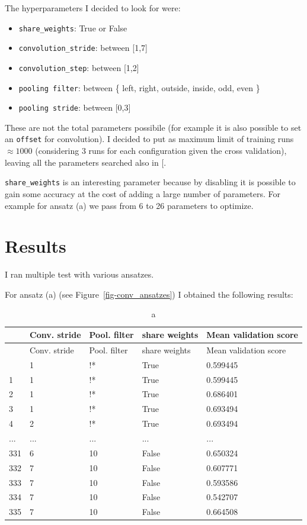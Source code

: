 \documentclass[
  13pt,
  a4paper,
  DIV=11,
  numbers=noendperiod]{scrreprt}
\providecommand{\tightlist}{%
  \setlength{\itemsep}{0pt}\setlength{\parskip}{0pt}}\usepackage{longtable,booktabs,array}
\begin{document}
The hyperparameters I decided to look for were:

\begin{itemize}
\tightlist
\item
  \texttt{share\_weights}: True or False
\item
  \texttt{convolution\_stride}: between {[}1,7{]}
\item
  \texttt{convolution\_step}: between {[}1,2{]}
\item
  \texttt{pooling\ filter}: between \{ left, right, outside, inside,
  odd, even \}
\item
  \texttt{pooling\ stride}: between {[}0,3{]}
\end{itemize}

These are not the total parameters possibile (for example it is also
possible to set an \texttt{offset} for convolution). I decided to put as
maximum limit of training runs \(\approx 1000\) (considering 3 runs for
each configuration given the cross validation), leaving all the
parameters searched also in
{[}\citeproc{ref-lourens2023hierarchical}{1}{]}.

\texttt{share\_weights} is an interesting parameter because by disabling
it is possible to gain some accuracy at the cost of adding a large
number of parameters. For example for ansatz (a) we pass from 6 to 26
parameters to optimize.


\chapter{Results}\label{results}

I ran multiple test with various ansatzes.

For ansatz (a) (see Figure~\ref{fig-conv_ansatzes}) I obtained the
following results:

\begin{longtable}[]{@{}lllll@{}}
\caption{a}\tabularnewline
\toprule\noalign{}
& Conv. stride & Pool. filter & share weights & Mean validation score \\
\midrule\noalign{}
\endfirsthead
\toprule\noalign{}
& Conv. stride & Pool. filter & share weights & Mean validation score \\
\midrule\noalign{}
\endhead
\bottomrule\noalign{}
\endlastfoot
0 & 1 & !* & True & 0.599445 \\
1 & 1 & !* & True & 0.599445 \\
2 & 1 & !* & True & 0.686401 \\
3 & 1 & !* & True & 0.693494 \\
4 & 2 & !* & True & 0.693494 \\
... & ... & ... & ... & ... \\
331 & 6 & 10 & False & 0.650324 \\
332 & 7 & 10 & False & 0.607771 \\
333 & 7 & 10 & False & 0.593586 \\
334 & 7 & 10 & False & 0.542707 \\
335 & 7 & 10 & False & 0.664508 \\
\end{longtable}
\end{document}
